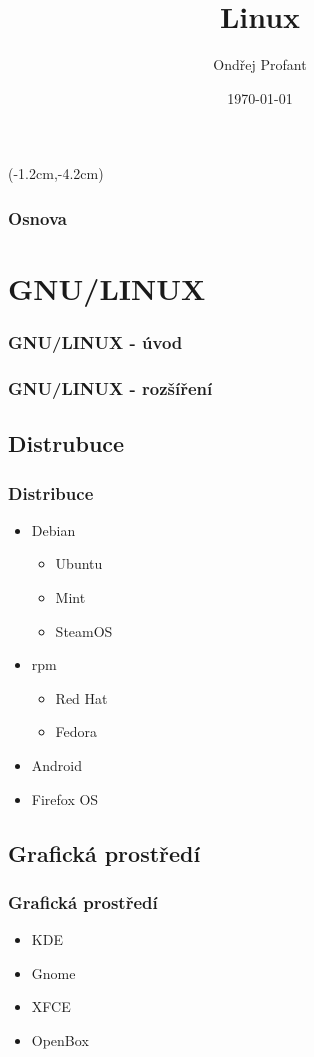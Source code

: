 \documentclass[xetex]{beamer}
\title{Linux}
\author{Ondřej Profant}
\institute[Piráti]{Česká pirátská strana}
\date{\today}
\begin{document}
\begin{frame}
  \begin{textblock*}{0cm}(-1.2cm,-4.2cm)
  \end{textblock*}
\end{frame}

\begin{frame}
  \titlepage
\end{frame}

\begin{frame}
  \frametitle{Osnova}
  \tableofcontents
\end{frame}	


\section{GNU/LINUX}
\begin{frame}
	\frametitle{GNU/LINUX - úvod}

\end{frame}

\begin{frame}
	\frametitle{GNU/LINUX - rozšíření}

\end{frame}

\subsection{Distrubuce}
\begin{frame}
	\frametitle{Distribuce}
	\begin{itemize}
		\item Debian 
		\begin{itemize}
			\item Ubuntu
			\item Mint
			\item SteamOS
		\end{itemize}
		\item rpm
		\begin{itemize}
			\item Red Hat
			\item Fedora
		\end{itemize}
		\item Android
		\item Firefox OS
	\end{itemize}
\end{frame}

\subsection{Grafická prostředí}
\begin{frame}
	\frametitle{Grafická prostředí}
	\begin{itemize}
		\item KDE
		\item Gnome
		\item XFCE
		\item OpenBox
	\end{itemize}
\end{frame}
\end{document}
